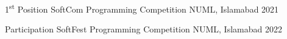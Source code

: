 



\begin{cvhonors}

  \cvhonor
    {1\textsuperscript{st} Position} %
    {SoftCom Programming Competition} %
    {NUML, Islamabad} %
    {2021} %

  \cvhonor
    {Participation} %
    {SoftFest Programming Competition} %
    {NUML, Islamabad} %
    {2022} %

\end{cvhonors}